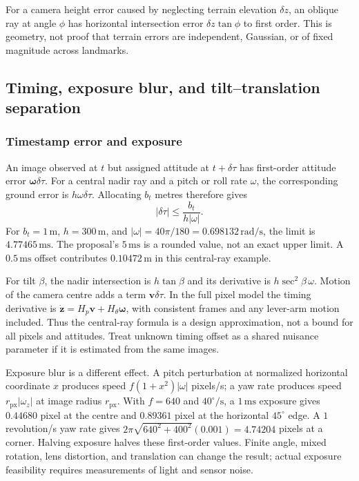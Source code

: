 \documentclass[11pt,a4paper]{article}
\numberwithin{equation}{section}
\begin{document}
For a camera height error caused by neglecting terrain elevation
$\delta z$, an oblique ray at angle $\phi$ has horizontal intersection
error $\delta z\tan\phi$ to first order. This is geometry, not proof that
terrain errors are independent, Gaussian, or of fixed magnitude across
landmarks.

\subsection{Timing, exposure blur, and tilt--translation separation}

\subsubsection{Timestamp error and exposure}

An image observed at $t$ but assigned attitude at $t+\delta\tau$ has
first-order attitude error $\boldsymbol\omega\delta\tau$. For a central
nadir ray and a pitch or roll rate $\omega$, the corresponding ground
error is $h\omega\delta\tau$. Allocating $b_t$ metres therefore gives
\begin{equation}
 |\delta\tau|\leq\frac{b_t}{h|\omega|}.
\end{equation}
For $b_t=1\,\mathrm m$, $h=300\,\mathrm m$, and
$|\omega|=40\pi/180=0.698132\,\mathrm{rad/s}$, the limit is
$4.77465\,\mathrm{ms}$. The proposal's $5\,\mathrm{ms}$ is a rounded
value, not an exact upper limit. A $0.5\,\mathrm{ms}$ offset contributes
$0.10472\,\mathrm m$ in this central-ray example.

For tilt $\beta$, the nadir intersection is $h\tan\beta$ and its derivative
is $h\sec^2\beta\,\omega$. Motion of the camera centre adds a term
$\boldsymbol v\delta\tau$. In the full pixel model the timing derivative
is $\dot{\boldsymbol z}=H_p\boldsymbol v+H_\theta\boldsymbol\omega$,
with consistent frames and any lever-arm motion included. Thus the
central-ray formula is a design approximation, not a bound for all
pixels and attitudes. Treat unknown timing offset as a shared nuisance
parameter if it is estimated from the same images.

Exposure blur is a different effect. A pitch perturbation at normalized
horizontal coordinate $x$ produces speed
$f(1+x^2)|\omega|$ pixels/s; a yaw rate produces speed
$r_{\mathrm{px}}|\omega_z|$ at image radius $r_{\mathrm{px}}$.
With $f=640$ and $40^\circ/\mathrm s$, a $1\,\mathrm{ms}$ exposure gives
$0.44680$ pixel at the centre and $0.89361$ pixel at the horizontal
$45^\circ$ edge. A $1$ revolution/s yaw rate gives
$2\pi\sqrt{640^2+400^2}(0.001)=4.74204$ pixels at a corner.
Halving exposure halves these first-order values. Finite angle, mixed
rotation, lens distortion, and translation can change the result; actual
exposure feasibility requires measurements of light and sensor noise.
\end{document}
